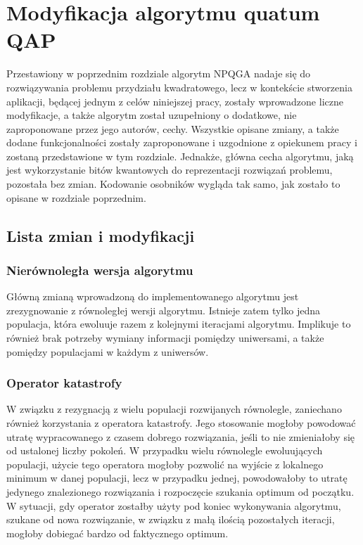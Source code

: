 \chapter{Modyfikacja algorytmu quatum QAP}
\label{cha:modyfikacja}
Przestawiony w poprzednim rozdziale algorytm NPQGA nadaje się do rozwiązywania problemu przydziału kwadratowego, lecz w kontekście stworzenia aplikacji, będącej jednym z celów niniejszej pracy, zostały wprowadzone liczne modyfikacje, a także algorytm został uzupełniony o dodatkowe, nie zaproponowane przez jego autorów, cechy. Wszystkie opisane zmiany, a także dodane funkcjonalności zostały zaproponowane i uzgodnione z opiekunem pracy i zostaną przedstawione w tym rozdziale. Jednakże, główna cecha algorytmu, jaką jest wykorzystanie bitów kwantowych do reprezentacji rozwiązań problemu, pozostała bez zmian. Kodowanie osobników wygląda tak samo, jak zostało to opisane w rozdziale poprzednim.

\section{Lista zmian i modyfikacji}
\subsection{Nierównoległa wersja algorytmu}
Główną zmianą wprowadzoną do implementowanego algorytmu jest zrezygnowanie z równoległej wersji algorytmu. Istnieje zatem tylko jedna populacja, która ewoluuje razem z kolejnymi iteracjami algorytmu. Implikuje to również brak potrzeby wymiany informacji pomiędzy uniwersami, a także pomiędzy populacjami w każdym z uniwersów.

\subsection{Operator katastrofy}
W związku z rezygnacją z wielu populacji rozwijanych równolegle, zaniechano również korzystania z operatora katastrofy. Jego stosowanie mogłoby powodować utratę wypracowanego z czasem dobrego rozwiązania, jeśli to nie zmieniałoby się od ustalonej liczby pokoleń. W przypadku wielu równolegle ewoluujących populacji, użycie tego operatora mogłoby pozwolić na wyjście z lokalnego minimum w danej populacji, lecz w przypadku jednej, powodowałoby to utratę jedynego znalezionego rozwiązania i rozpoczęcie szukania optimum od początku. W sytuacji, gdy operator zostałby użyty pod koniec wykonywania algorytmu, szukane od nowa rozwiązanie, w związku z małą ilością pozostałych iteracji, mogłoby dobiegać bardzo od faktycznego optimum.

